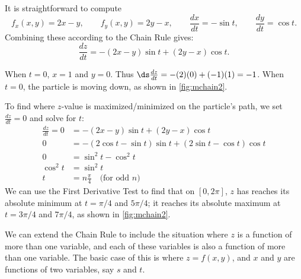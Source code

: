 {It is straightforward to compute
$$f_x(x,y) = 2x-y,\qquad f_y(x,y) = 2y-x,\qquad \frac{dx}{dt} = -\sin t,\qquad \frac{dy}{dt} = \cos t.$$
Combining these according to the Chain Rule gives:
$$\frac{dz}{dt} = -(2x-y)\sin t + (2y-x)\cos t.$$

When $t=0$, $x=1$ and $y=0$. Thus $\ds\frac{dz}{dt} = -(2)(0)+ (-1)(1) = -1$. When $t=0$, the particle is moving down, as shown in \autoref{fig:mchain2}. 

To find where $z$-value is maximized/minimized on the particle's path, we set $\frac{dz}{dt}=0$ and solve for $t$:
\begin{align*}
\frac{dz}{dt} =0 &= -(2x-y)\sin t + (2y-x)\cos t\\
			0&= -(2\cos t-\sin t)\sin t+(2\sin t-\cos t)\cos t\\
			0&= \sin^2t-\cos^2t\\
\cos^2t &=\sin^2t\\
	t&= n\frac{\pi}4\quad \text{(for odd $n$)}
\end{align*}
We can use the First Derivative Test to find that on $[0,2\pi]$, $z$ has reaches its absolute minimum at $t=\pi/4$ and $5\pi/4$; it reaches its absolute maximum at $t=3\pi/4$ and $7\pi/4$, as shown in \autoref{fig:mchain2}.}


We can extend the Chain Rule to include the situation where $z$ is a function of more than one variable, and each of these variables is also a function of more than one variable. The basic case of this is where $z=f(x,y)$, and $x$ and $y$ are functions of two variables, say $s$ and $t$.

